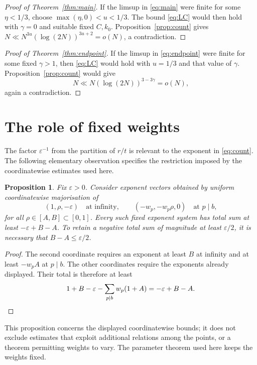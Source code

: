 \documentclass[11pt]{article}
\numberwithin{equation}{section}
\newtheorem{proposition}[theorem]{Proposition}
\theoremstyle{remark}
\newcommand{\eps}{\varepsilon}
\begin{document}
\begin{proof}[Proof of Theorem~\ref{thm:main}]
If the limsup in \eqref{eq:main} were finite for some
$\eta<1/3$, choose $\max(\eta,0)<u<1/3$.
The bound \eqref{eq:LC} would then hold with $\gamma=0$ and suitable
fixed $C,k_0$. Proposition~\ref{prop:count} gives
$N\ll N^{3u}(\log(2N))^{3u+2}=o(N)$, a contradiction.
\end{proof}

\begin{proof}[Proof of Theorem~\ref{thm:endpoint}]
If the limsup in \eqref{eq:endpoint} were finite for some fixed
$\gamma>1$, then \eqref{eq:LC} would hold with $u=1/3$ and that value
of $\gamma$. Proposition~\ref{prop:count} would give
\[
 N\ll N(\log(2N))^{3-3\gamma}=o(N),
\]
again a contradiction.
\end{proof}

\section{The role of fixed weights}\label{sec:scope}

The factor $\eps^{-1}$ from the partition of $r/t$ is relevant to
the exponent in \eqref{eq:count}. The following elementary observation
specifies the restriction imposed by the coordinatewise estimates
used here.

\begin{proposition}\label{prop:bins}
Fix $\eps>0$. Consider exponent vectors obtained by uniform
coordinatewise majorisation of
\[
 (1,\rho,-\eps)\quad\text{at infinity},\qquad
 (-w_p,-w_p\rho,0)\quad\text{at }p\mid b,
\]
for all $\rho\in[A,B]\subset[0,1]$.
Every such fixed exponent system has total sum at least
$-\eps+B-A$. To retain a negative total sum of magnitude at least
$\eps/2$, it is necessary that $B-A\le\eps/2$.
\end{proposition}
\begin{proof}
The second coordinate requires an exponent at least $B$ at infinity
and at least $-w_pA$ at $p\mid b$. The other coordinates require
the exponents already displayed. Their total is therefore at least
\[
 1+B-\eps-\sum_{p\mid b}w_p(1+A)=-\eps+B-A.
 \qedhere
\]
\end{proof}

This proposition concerns the displayed coordinatewise bounds;
it does not exclude estimates that exploit additional relations
among the points, or a theorem permitting weights to vary.
The parameter theorem used here keeps the weights fixed.
\end{document}
